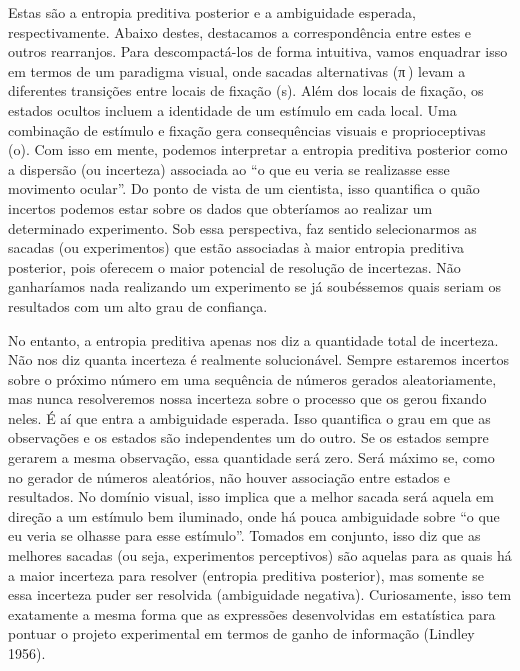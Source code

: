 \documentclass[
  12pt,
]{book}
\begin{document}
Estas são a entropia preditiva posterior e a ambiguidade esperada, respectivamente. Abaixo destes, destacamos a correspondência entre estes e outros rearranjos. Para descompactá-los de forma intuitiva, vamos enquadrar isso em termos de um paradigma visual, onde sacadas alternativas (π ) levam a diferentes transições entre locais de fixação (s). Além dos locais de fixação, os estados ocultos incluem a identidade de um estímulo em cada local. Uma combinação de estímulo e fixação gera consequências visuais e proprioceptivas (o). Com isso em mente, podemos interpretar a entropia preditiva posterior como a dispersão (ou incerteza) associada ao ``o que eu veria se realizasse esse movimento ocular''. Do ponto de vista de um cientista, isso quantifica o quão incertos podemos estar sobre os dados que obteríamos ao realizar um determinado experimento. Sob essa perspectiva, faz sentido selecionarmos as sacadas (ou experimentos) que estão associadas à maior entropia preditiva posterior, pois oferecem o maior potencial de resolução de incertezas. Não ganharíamos nada realizando um experimento se já soubéssemos quais seriam os resultados com um alto grau de confiança.

No entanto, a entropia preditiva apenas nos diz a quantidade total de incerteza. Não nos diz quanta incerteza é realmente solucionável. Sempre estaremos incertos sobre o próximo número em uma sequência de números gerados aleatoriamente, mas nunca resolveremos nossa incerteza sobre o processo que os gerou fixando neles. É aí que entra a ambiguidade esperada. Isso quantifica o grau em que as observações e os estados são independentes um do outro. Se os estados sempre gerarem a mesma observação, essa quantidade será zero. Será máximo se, como no gerador de números aleatórios, não houver associação entre estados e resultados. No domínio visual, isso implica que a melhor sacada será aquela em direção a um estímulo bem iluminado, onde há pouca ambiguidade sobre ``o que eu veria se olhasse para esse estímulo''. Tomados em conjunto, isso diz que as melhores sacadas (ou seja, experimentos perceptivos) são aquelas para as quais há a maior incerteza para resolver (entropia preditiva posterior), mas somente se essa incerteza puder ser resolvida (ambiguidade negativa). Curiosamente, isso tem exatamente a mesma forma que as expressões desenvolvidas em estatística para pontuar o projeto experimental em termos de ganho de informação (Lindley 1956).
\end{document}
